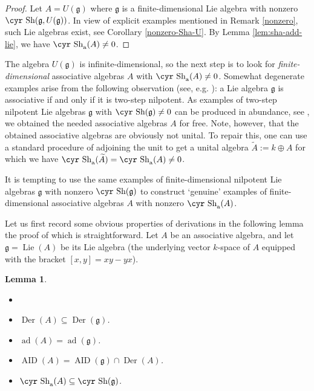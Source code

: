 \documentclass[11pt,reqno]{amsart}
\numberwithin{equation}{section}
\newtheorem{lemma}[theorem]{Lemma}
\theoremstyle{definition}
\newcommand{\AID}{{\operatorname{ AID}}}
\newcommand{\Der}{{\operatorname{ Der}}}
\newcommand{\ad}{{\operatorname{ ad}}}
\newcommand{\Lie}{{\operatorname{ Lie}}}
\def\Sha{\text{\cyr Sh}}
\def\g{\mathfrak g}
\begin{document}
\begin{proof}
Let $A=U(\g )$ where $\g$ is a finite-dimensional Lie algebra with nonzero
$\Sha (\g ,U(\g))$. In view of explicit examples mentioned in Remark \ref{nonzero},
such Lie algebras exist, see Corollary \ref{nonzero-Sha-U}.
By Lemma \ref{lem:sha-add-lie}, we have $\Sha_{\text{\rm{a}}}(A)\ne 0$.
\end{proof}

\medskip


The algebra $U(\g)$ is infinite-dimensional, so the next step is to look for
{\it {finite-dimensional}} associative algebras $A$ with $\Sha_{\text{\rm{a}}}(A)\ne 0$.
Somewhat degenerate examples arise from the following observation (see, e.g.
\cite[Proposition~1]{GR}): a Lie algebra $\g$ is associative if and only if it is
two-step nilpotent. As examples of two-step nilpotent Lie algebras $\g$ with
$\Sha(\g)\ne 0$ can be produced in abundance, see \cite{BDV2},
we obtained the needed associative algebras $A$ for free. Note, however, that
the obtained associative algebras are obviously not unital. To repair this,
one can use a standard procedure of adjoining the unit to get a unital algebra
$\widetilde A:=k\oplus A$ for which we have
$\Sha_{\text{\rm{a}}}(\widetilde A)=\Sha_{\text{\rm{a}}}(A)\ne 0$.



It is tempting to use the same examples of finite-dimensional nilpotent Lie algebras $\g$ with nonzero $\Sha (\g)$
to construct `genuine' examples of finite-dimensional associative algebras $A$ with nonzero
$\Sha_{\text{\rm{a}}}(A)$.

Let us first record some obvious properties of derivations in the following lemma the proof of which
is straightforward. Let $A$ be an associative algebra, and let $\g=\Lie (A)$ be its Lie algebra
(the underlying vector $k$-space of $A$ equipped with the bracket $[x,y]=xy-yx$).

\begin{lemma} \label{ass-lie}
\begin{itemize}
\item[]
\item[(i)] $\Der(A)\subseteq\Der (\g)$.
\item[(ii)] $\ad(A) = \ad(\g)$.
\item[(iii)] $\AID (A) =\AID (\g)\cap \Der (A)$.
\item[(iv)] $\Sha_{\text{\rm{a}}}(A)\subseteq\Sha (\g)$.
\end{itemize}
\end{lemma}
\end{document}
